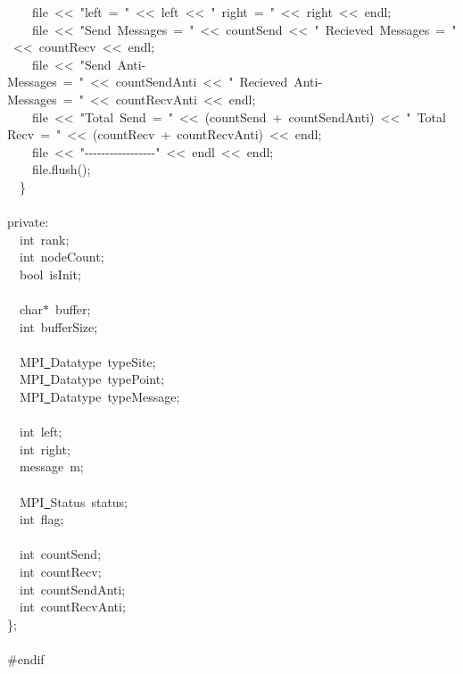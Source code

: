 {\ \ \ \ file\ <{}<{}\ "{}left\ =\ "{}\ <{}<{}\ left\ <{}<{}\ "{}\ right\ =\ "{}\ <{}<{}\ right\ <{}<{}\ endl;\\
\ \ \ \ file\ <{}<{}\ "{}Send\ Messages\ =\ "{}\ <{}<{}\ countSend\ <{}<{}\ "{}\ Recieved\ Messages\ =\ "{}\ <{}<{}\ countRecv\ <{}<{}\ endl;\\
\ \ \ \ file\ <{}<{}\ "{}Send\ Anti-{}Messages\ =\ "{}\ <{}<{}\ countSendAnti\ <{}<{}\ "{}\ Recieved\ Anti-{}Messages\ =\ "{}\ <{}<{}\ countRecvAnti\ <{}<{}\ endl;\\
\ \ \ \ file\ <{}<{}\ "{}Total\ Send\ =\ "{}\ <{}<{}\ (countSend\ +\ countSendAnti)\ <{}<{}\ "{}\ Total\ Recv\ =\ "{}\ <{}<{}\ (countRecv\ +\ countRecvAnti)\ <{}<{}\ endl;\\
\ \ \ \ file\ <{}<{}\ "{}-{}-{}-{}-{}-{}-{}-{}-{}-{}-{}-{}-{}-{}-{}-{}-{}-{}"{}\ <{}<{}\ endl\ <{}<{}\ endl;\\
\ \ \ \ file.flush();\\
\ \ \}\\
\ \\
private:\\
\ \ int\ rank;\\
\ \ int\ nodeCount;\\
\ \ bool\ isInit;\\
\ \\
\ \ char$\ast$\ buffer;\\
\ \ int\ bufferSize;\\
\ \\
\ \ MPI\underline\ Datatype\ typeSite;\\
\ \ MPI\underline\ Datatype\ typePoint;\\
\ \ MPI\underline\ Datatype\ typeMessage;\\
\ \\
\ \ int\ left;\\
\ \ int\ right;\\
\ \ message\ m;\\
\ \\
\ \ MPI\underline\ Status\ status;\\
\ \ int\ flag;\\
\ \\
\ \ int\ countSend;\\
\ \ int\ countRecv;\\
\ \ int\ countSendAnti;\\
\ \ int\ countRecvAnti;\\
\};\\
\ \\
\#endif\\
\ \\
 }
\normalfont\normalsize

